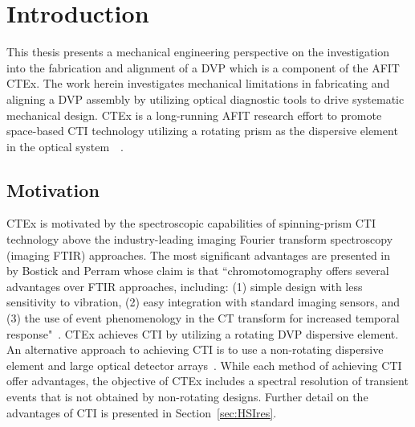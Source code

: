 \chapter{Introduction}
\label{ch:intro}

This thesis presents a mechanical engineering perspective on the investigation into the fabrication and alignment of a \acf{DVP} which is a component of the \acf{AFIT} \acf{CTEx}. The work herein investigates mechanical limitations in fabricating and aligning a \ac{DVP} assembly by utilizing optical diagnostic tools to drive systematic mechanical design. \ac{CTEx} is a long-running \ac{AFIT} research effort to promote space-based \acf{CTI} technology utilizing a rotating prism as the dispersive element in the optical system~\cite{Lemaster,Dearinger, Gustke, Gould}~\cite{ODell, ODellSPIE, Niederhauser}.


\section{Motivation}
\label{sec:motivation}

 \ac{CTEx} is motivated by the spectroscopic capabilities of spinning-prism \ac{CTI} technology above the industry-leading imaging Fourier transform spectroscopy (imaging FTIR) approaches. The most significant advantages are presented in~\cite{Bostick08} by Bostick and Perram whose claim is that ``chromotomography offers several advantages over FTIR approaches, including: (1) simple design with less sensitivity to vibration, (2) easy integration with standard imaging sensors, and (3) the use of event phenomenology in the CT transform for increased temporal response"~\cite[p. 519]{Bostick08}. \ac{CTEx} achieves \ac{CTI} by utilizing a rotating \ac{DVP} dispersive element. An alternative approach to achieving \ac{CTI} is to use a non-rotating dispersive element and large optical detector arrays~\cite{Descour}. While each method of achieving \ac{CTI} offer advantages, the objective of \ac{CTEx} includes a spectral resolution of transient events that is not obtained by non-rotating designs. Further detail on the advantages of \ac{CTI} is presented in Section~\ref{sec:HSIres}.

